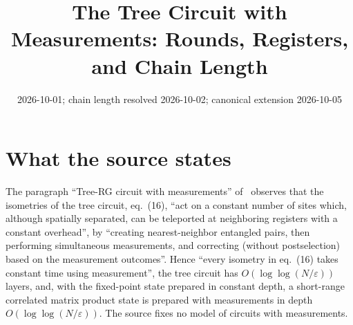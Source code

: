 \documentclass{article}
\title{The Tree Circuit with Measurements: Rounds, Registers, and Chain Length}
\author{}
\date{2026-10-01; chain length resolved 2026-10-02; canonical extension 2026-10-05}
\begin{document}
\maketitle
{}

\section{What the source states}
The paragraph ``Tree-RG circuit with measurements''
of~\cite{Malz2024Preparation} observes that the isometries of the tree circuit,
eq.~(16), ``act on a constant number of sites which, although spatially
separated, can be teleported at neighboring registers with a constant
overhead'', by ``creating nearest-neighbor entangled pairs, then performing
simultaneous measurements, and correcting (without postselection) based on the
measurement outcomes''. Hence ``every isometry in eq.~(16) takes constant time
using measurement'', the tree circuit has $O(\log\log(N/\varepsilon))$ layers,
and, with the fixed-point state prepared in constant depth, a short-range
correlated matrix product state is prepared with measurements in depth
$O(\log\log(N/\varepsilon))$. The source fixes no model of circuits with
measurements.
\end{document}
